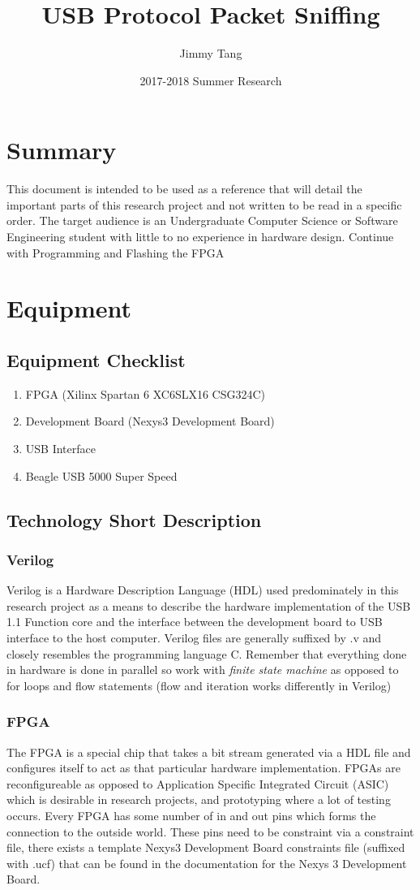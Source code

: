 \documentclass[10pt,a4paper]{article}
\author{Jimmy Tang}
\date{2017-2018 Summer Research}
\title{USB Protocol Packet Sniffing}
\begin{document}
\maketitle
{}
\tableofcontents

\newpage
{}
\section{Summary}
This document is intended to be used as a reference that will detail the important parts of this research project and not written to be read in a specific order. The target audience is an Undergraduate Computer Science or Software Engineering student with little to no experience in hardware design. Continue with Programming and Flashing the FPGA 
\section{Equipment}
\subsection{Equipment Checklist}
\begin{enumerate}
	\item FPGA (Xilinx Spartan 6 XC6SLX16 CSG324C)
	\item Development Board (Nexys3 Development Board)
	\item USB Interface
	\item Beagle USB 5000 Super Speed
\end{enumerate}
\subsection{Technology Short Description}
\subsubsection{Verilog}
Verilog is a Hardware Description Language (HDL) used predominately in this research project as a means to describe the hardware implementation of the USB 1.1 Function core and the interface between the development board to USB interface to the host computer. Verilog files are generally suffixed by .v and closely resembles the programming language C. Remember that everything done in hardware is done in parallel so work with \emph{finite state machine} as opposed to for loops and flow statements (flow and iteration works differently in Verilog)
\subsubsection{FPGA}
The FPGA is a special chip that takes a bit stream generated via a HDL file and configures itself to act as that particular hardware implementation. FPGAs are reconfigureable as opposed to Application Specific Integrated Circuit (ASIC) which is desirable in research projects, and prototyping where a lot of testing occurs. Every FPGA has some number of in and out pins which forms the connection to the outside world. These pins need to be constraint via a constraint file, there exists a template Nexys3 Development Board constraints file (suffixed with .ucf) that can be found in the documentation for the Nexys 3 Development Board.
\end{document}
